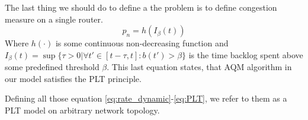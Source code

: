 The last thing we should do to define a the problem is to define congestion measure on a single router.
\begin{equation}
    p_n = h(I_\beta(t)) \label{eq:PLT}
\end{equation}
Where $h(\cdot)$ is some continuous non-decreasing function and $I_\beta(t) = \sup \{\tau > 0 | \forall t' \in [t - \tau, t] : b(t') > \beta\}$ is the time backlog spent above some predefined threshold $\beta$. This last equation states, that AQM algorithm in our model satisfies the PLT principle.

Defining all those equation \ref{eq:rate_dynamic}-\ref{eq:PLT}, we refer to them as a PLT model on arbitrary network topology.